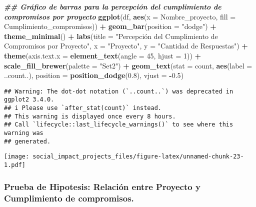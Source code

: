 \documentclass[
]{article}
\newenvironment{Shaded}{\begin{snugshade}}{\end{snugshade}}
\newcommand{\AttributeTok}[1]{\textcolor[rgb]{0.13,0.29,0.53}{#1}}
\newcommand{\DecValTok}[1]{\textcolor[rgb]{0.00,0.00,0.81}{#1}}
\newcommand{\DocumentationTok}[1]{\textcolor[rgb]{0.56,0.35,0.01}{\textbf{\textit{#1}}}}
\newcommand{\FloatTok}[1]{\textcolor[rgb]{0.00,0.00,0.81}{#1}}
\newcommand{\FunctionTok}[1]{\textcolor[rgb]{0.13,0.29,0.53}{\textbf{#1}}}
\newcommand{\NormalTok}[1]{#1}
\newcommand{\SpecialCharTok}[1]{\textcolor[rgb]{0.81,0.36,0.00}{\textbf{#1}}}
\newcommand{\StringTok}[1]{\textcolor[rgb]{0.31,0.60,0.02}{#1}}
\begin{document}
\begin{Shaded}
\begin{Highlighting}[]
\DocumentationTok{\#\# Gráfico de barras para la percepción del cumplimiento de compromisos por proyecto}
\FunctionTok{ggplot}\NormalTok{(df, }\FunctionTok{aes}\NormalTok{(}\AttributeTok{x =}\NormalTok{ Nombre\_proyecto, }\AttributeTok{fill =}\NormalTok{ Cumplimiento\_compromisos)) }\SpecialCharTok{+}
  \FunctionTok{geom\_bar}\NormalTok{(}\AttributeTok{position =} \StringTok{"dodge"}\NormalTok{) }\SpecialCharTok{+}
  \FunctionTok{theme\_minimal}\NormalTok{() }\SpecialCharTok{+}
  \FunctionTok{labs}\NormalTok{(}\AttributeTok{title =} \StringTok{"Percepción del Cumplimiento de Compromisos por Proyecto"}\NormalTok{,}
       \AttributeTok{x =} \StringTok{"Proyecto"}\NormalTok{,}
       \AttributeTok{y =} \StringTok{"Cantidad de Respuestas"}\NormalTok{) }\SpecialCharTok{+}
  \FunctionTok{theme}\NormalTok{(}\AttributeTok{axis.text.x =} \FunctionTok{element\_text}\NormalTok{(}\AttributeTok{angle =} \DecValTok{45}\NormalTok{, }\AttributeTok{hjust =} \DecValTok{1}\NormalTok{)) }\SpecialCharTok{+}
  \FunctionTok{scale\_fill\_brewer}\NormalTok{(}\AttributeTok{palette =} \StringTok{"Set2"}\NormalTok{) }\SpecialCharTok{+}
  \FunctionTok{geom\_text}\NormalTok{(}\AttributeTok{stat =} \StringTok{\textquotesingle{}count\textquotesingle{}}\NormalTok{, }\FunctionTok{aes}\NormalTok{(}\AttributeTok{label =}\NormalTok{ ..count..), }\AttributeTok{position =} \FunctionTok{position\_dodge}\NormalTok{(}\FloatTok{0.8}\NormalTok{), }\AttributeTok{vjust =} \SpecialCharTok{{-}}\FloatTok{0.5}\NormalTok{)}
\end{Highlighting}
\end{Shaded}

\begin{verbatim}
## Warning: The dot-dot notation (`..count..`) was deprecated in ggplot2 3.4.0.
## i Please use `after_stat(count)` instead.
## This warning is displayed once every 8 hours.
## Call `lifecycle::last_lifecycle_warnings()` to see where this warning was
## generated.
\end{verbatim}

\texttt{[image: social\_impact\_projects\_files/figure-latex/unnamed-chunk-23-1.pdf]}

\subsubsection{\texorpdfstring{\textbf{Prueba de Hipotesis:} Relación
entre Proyecto y Cumplimiento de
compromisos.}{Prueba de Hipotesis: Relación entre Proyecto y Cumplimiento de compromisos.}}\label{prueba-de-hipotesis-relaciuxf3n-entre-proyecto-y-cumplimiento-de-compromisos.}
\end{document}
